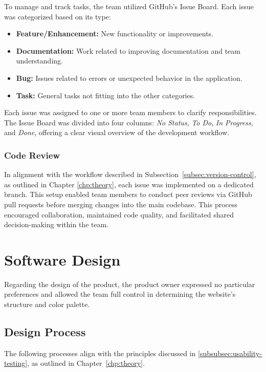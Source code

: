 To manage and track tasks, the team utilized GitHub’s Issue Board. Each issue was categorized based on its type:
\begin{itemize}
  \item \textbf{Feature/Enhancement:} New functionality or improvements.
  \item \textbf{Documentation:} Work related to improving documentation and team understanding.
  \item \textbf{Bug:} Issues related to errors or unexpected behavior in the application.
  \item \textbf{Task:} General tasks not fitting into the other categories.
\end{itemize}

Each issue was assigned to one or more team members to clarify responsibilities. The Issue Board was divided into four columns:
\textit{No Status}, \textit{To Do}, \textit{In Progress}, and \textit{Done}, offering a clear visual overview of the development workflow.

\subsubsection*{Code Review}

In alignment with the workflow described in Subsection~\ref{subsec:version-control}, as outlined in Chapter \ref{chp:theory}, each issue was implemented on a dedicated branch. This setup enabled team members to conduct peer reviews via GitHub pull requests before merging changes into the main codebase. This process encouraged collaboration, maintained code quality, and facilitated shared decision-making within the team.

\newpage

\section{Software Design}
\label{sec:software-design}

Regarding the design of the product, the product owner expressed no particular preferences and allowed the team full control in determining the website’s structure and color palette.

\subsection{Design Process}
\label{subsec:design-process}

The following processes align with the principles discussed in \ref{subsubsec:usability-testing}, as outlined in Chapter~\ref{chp:theory}.

